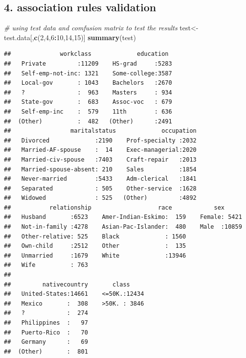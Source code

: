\documentclass[]{article}
\newenvironment{Shaded}{\begin{snugshade}}{\end{snugshade}}
\newcommand{\KeywordTok}[1]{\textcolor[rgb]{0.13,0.29,0.53}{\textbf{#1}}}
\newcommand{\DecValTok}[1]{\textcolor[rgb]{0.00,0.00,0.81}{#1}}
\newcommand{\CommentTok}[1]{\textcolor[rgb]{0.56,0.35,0.01}{\textit{#1}}}
\newcommand{\OperatorTok}[1]{\textcolor[rgb]{0.81,0.36,0.00}{\textbf{#1}}}
\newcommand{\NormalTok}[1]{#1}
\begin{document}
\subsection{4. association rules
validation}\label{association-rules-validation}

\begin{Shaded}
\begin{Highlighting}[]
\CommentTok{# using test data and comfusion matrix to test the results }
\NormalTok{test<-test.data[,}\KeywordTok{c}\NormalTok{(}\DecValTok{2}\NormalTok{,}\DecValTok{4}\NormalTok{,}\DecValTok{6}\OperatorTok{:}\DecValTok{10}\NormalTok{,}\DecValTok{14}\NormalTok{,}\DecValTok{15}\NormalTok{)]}
\KeywordTok{summary}\NormalTok{(test)}
\end{Highlighting}
\end{Shaded}

\begin{verbatim}
##              workclass             education   
##   Private         :11209    HS-grad     :5283  
##   Self-emp-not-inc: 1321    Some-college:3587  
##   Local-gov       : 1043    Bachelors   :2670  
##   ?               :  963    Masters     : 934  
##   State-gov       :  683    Assoc-voc   : 679  
##   Self-emp-inc    :  579    11th        : 636  
##  (Other)          :  482   (Other)      :2491  
##                 maritalstatus             occupation  
##   Divorced             :2190    Prof-specialty :2032  
##   Married-AF-spouse    :  14    Exec-managerial:2020  
##   Married-civ-spouse   :7403    Craft-repair   :2013  
##   Married-spouse-absent: 210    Sales          :1854  
##   Never-married        :5433    Adm-clerical   :1841  
##   Separated            : 505    Other-service  :1628  
##   Widowed              : 525   (Other)         :4892  
##           relationship                   race            sex       
##   Husband       :6523    Amer-Indian-Eskimo:  159    Female: 5421  
##   Not-in-family :4278    Asian-Pac-Islander:  480    Male  :10859  
##   Other-relative: 525    Black             : 1560                  
##   Own-child     :2512    Other             :  135                  
##   Unmarried     :1679    White             :13946                  
##   Wife          : 763                                              
##                                                                    
##         nativecountry       class      
##   United-States:14661    <=50K.:12434  
##   Mexico       :  308    >50K. : 3846  
##   ?            :  274                  
##   Philippines  :   97                  
##   Puerto-Rico  :   70                  
##   Germany      :   69                  
##  (Other)       :  801
\end{verbatim}
\end{document}
